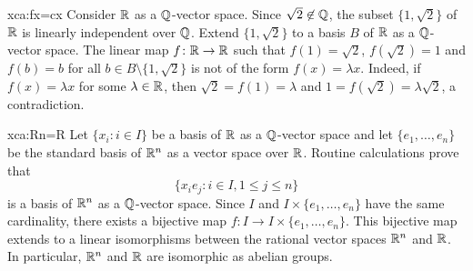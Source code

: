 \begin{sol}{xca:fx=cx}
    Consider $\mathbb{R}$ as a $\mathbb{Q}$-vector space. 
    Since $\sqrt{2}\not\in\mathbb{Q}$, the subset $\{1,\sqrt{2}\}$ of $\mathbb{R}$ 
    is linearly independent 
    over $\mathbb{Q}$. Extend $\{1,\sqrt{2}\}$ 
    to a basis $B$ of $\mathbb{R}$ as a $\mathbb{Q}$-vector space. The
    linear map $f\colon\mathbb{R}\to\mathbb{R}$ such that
    $f(1)=\sqrt{2}$, $f(\sqrt{2})=1$ and $f(b)=b$ for all $b\in B\setminus\{1,\sqrt{2}\}$ 
    is not of the form $f(x)=\lambda x$. Indeed, if $f(x)=\lambda x$ for some $\lambda\in\mathbb{R}$, 
    then $\sqrt{2}=f(1)=\lambda$ and $1=f(\sqrt{2})=\lambda\sqrt{2}$, a contradiction. 
\end{sol}

\begin{sol}{xca:Rn=R}
    Let $\{x_i:i\in I\}$ be a basis of $\mathbb{R}$ as a $\mathbb{Q}$-vector space and
    let $\{e_1,\dots,e_n\}$ be the standard basis of $\mathbb{R}^n$ as a vector space over $\mathbb{R}$. 
    Routine calculations prove that  
    \[
    \{x_ie_j:i\in I,1\leq j\leq n\}
    \]
    is a basis of $\mathbb{R}^n$ as a $\mathbb{Q}$-vector space. 
    Since
    $I$ and $I\times\{e_1,\dots,e_n\}$ have the same cardinality, 
    there exists a bijective map $f\colon I\to I\times\{e_1,\dots,e_n\}$. This bijective
    map extends to a linear isomorphisms between the rational vector spaces 
    $\mathbb{R}^n$ and
    $\mathbb{R}$. In particular, $\mathbb{R}^n$ and 
    $\mathbb{R}$ are isomorphic as abelian groups. 
\end{sol}










